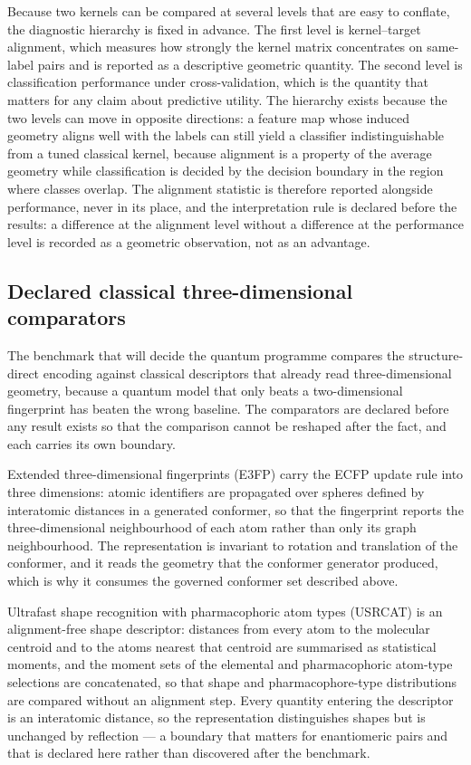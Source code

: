 Because two kernels can be compared at several levels that are easy to conflate, the diagnostic hierarchy is fixed in advance. The first level is kernel--target alignment, which measures how strongly the kernel matrix concentrates on same-label pairs and is reported as a descriptive geometric quantity. The second level is classification performance under cross-validation, which is the quantity that matters for any claim about predictive utility. The hierarchy exists because the two levels can move in opposite directions: a feature map whose induced geometry aligns well with the labels can still yield a classifier indistinguishable from a tuned classical kernel, because alignment is a property of the average geometry while classification is decided by the decision boundary in the region where classes overlap. The alignment statistic is therefore reported alongside performance, never in its place, and the interpretation rule is declared before the results: a difference at the alignment level without a difference at the performance level is recorded as a geometric observation, not as an advantage.

\subsection{Declared classical three-dimensional comparators}\label{sec:comparator3d_methods}

The benchmark that will decide the quantum programme compares the structure-direct encoding against classical descriptors that already read three-dimensional geometry, because a quantum model that only beats a two-dimensional fingerprint has beaten the wrong baseline. The comparators are declared before any result exists so that the comparison cannot be reshaped after the fact, and each carries its own boundary.

Extended three-dimensional fingerprints (E3FP)\cite{Axen2017} carry the ECFP update rule into three dimensions: atomic identifiers are propagated over spheres defined by interatomic distances in a generated conformer, so that the fingerprint reports the three-dimensional neighbourhood of each atom rather than only its graph neighbourhood. The representation is invariant to rotation and translation of the conformer, and it reads the geometry that the conformer generator produced, which is why it consumes the governed conformer set described above.

Ultrafast shape recognition with pharmacophoric atom types (USRCAT)\cite{Schreyer2012} is an alignment-free shape descriptor: distances from every atom to the molecular centroid and to the atoms nearest that centroid are summarised as statistical moments, and the moment sets of the elemental and pharmacophoric atom-type selections are concatenated, so that shape and pharmacophore-type distributions are compared without an alignment step. Every quantity entering the descriptor is an interatomic distance, so the representation distinguishes shapes but is unchanged by reflection --- a boundary that matters for enantiomeric pairs and that is declared here rather than discovered after the benchmark.

